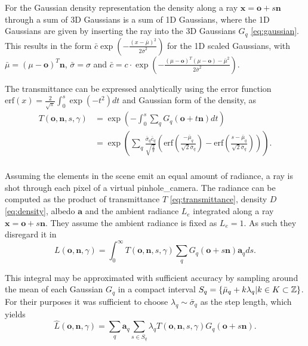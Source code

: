\documentclass[a4paper, 11pt]{memoir}
\newcommand*{\erf}{\text{erf}}
\begin{document}
    For the Gaussian density representation the density along a ray $\mathbf{x} = \mathbf{o} + s\mathbf{n}$ through a
    sum of 3D Gaussians is a sum of 1D Gaussians, where the 1D Gaussians are given by inserting the ray into the
    3D Gaussians $G_q$ \eqref{eq:gaussian}. This results in the form
    $\bar{c} \exp{\left( - \frac{(x - \bar{\mu})^2}{2\bar{\sigma}^2} \right)}$ for the 1D scaled Gaussians, with
    $\bar{\mu} = (\mu - \mathbf{o})^T\mathbf{n}$, $\bar{\sigma} = \sigma$ and
    $\bar{c} = c \cdot \exp{\left( - \frac{(\mu - \mathbf{o})^T(\mu - \mathbf{o}) - \bar{\mu}^2}{2\bar{\sigma}^2} \right)}$.

    The \gls{transmittance} can be expressed analytically using the error function
    $\erf{(x)} = \frac{2}{\sqrt{\pi}}\int_0^s \exp{(-t^2)} dt$ and Gaussian form of the density, as
    \begin{equation}
        \begin{aligned}
            T(\mathbf{o}, \mathbf{n}, s, \gamma) &= \exp{\left( -\int_0^s
                \sum_q G_q(\mathbf{o} + t\mathbf{n} ) dt \right)}\\
            &= \exp{\left( \sum_q \frac{\bar{\sigma}_q \bar{c}_q}{\sqrt{\frac{2}{\pi}}}
            \left( \erf{\left( \frac{-\bar{\mu}_q}{\sqrt{2}\bar{\sigma}_q} \right)}
            - \erf{\left( \frac{s - \bar{\mu}_q}{\sqrt{2}\bar{\sigma}_q} \right)} \right) \right)}.\\
        \end{aligned}
        \label{eq:transmittance_analytical}
    \end{equation}

    Assuming the elements in the scene emit an equal amount of \gls{radiance}, a ray is shot through each pixel of a virtual
    \gls{pinhole_camera}. The \gls{radiance} can be computed as the product of \gls{transmittance} $T$ \eqref{eq:transmittance},
    density $D$ \eqref{eq:density}, \gls{albedo} $\mathbf{a}$ and the ambient \gls{radiance} $L_e$ integrated along a ray
    $\mathbf{x} = \mathbf{o} + s\mathbf{n}$. They assume the ambient \gls{radiance} is fixed as $L_e = 1$. As such they
    disregard it in
    \begin{equation}
        L(\mathbf{o}, \mathbf{n}, \gamma) = \int_0^\infty T(\mathbf{o}, \mathbf{n}, s, \gamma)
            \sum_q G_q(\mathbf{o} + s\mathbf{n})\mathbf{a}_q ds.
    \end{equation}
    
    This integral may be approximated with sufficient accuracy by sampling around the mean of each Gaussian $G_q$ in
    a compact interval $S_q = \{ \bar{\mu}_q + k\lambda_q | k \in K \subset \mathbb{Z} \}$. For their purposes it was sufficient
    to choose $\lambda_q \sim \bar{\sigma}_q$ as the step length, which yields
    \begin{equation}
        \hat{L}(\mathbf{o}, \mathbf{n}, \gamma) = \sum_q \mathbf{a}_q \sum_{s \in S_q}
            \lambda_q T(\mathbf{o}, \mathbf{n}, s, \gamma)G_q(\mathbf{o} + s\mathbf{n}).
        \label{eq:radiance}
    \end{equation}
\end{document}
